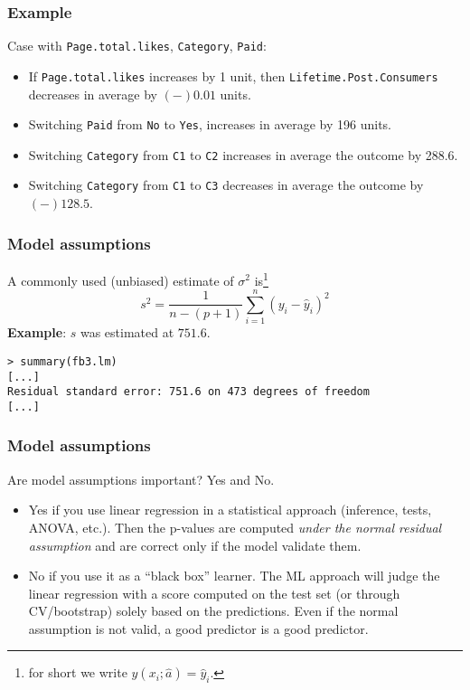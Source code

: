 \begin{frame}
\frametitle{Example}
Case with {\tt Page.total.likes}, {\tt Category}, {\tt Paid}:
\begin{itemize}
\item If {\tt Page.total.likes} increases by 1 unit, then {\tt Lifetime.Post.Consumers} decreases in average by $(-)0.01$ units.
\item Switching {\tt Paid} from {\tt No} to {\tt Yes}, increases in average by 196 units.
\item Switching {\tt Category} from {\tt C1} to {\tt C2} increases in average the outcome by 288.6. 
\item Switching {\tt Category} from {\tt C1} to {\tt C3} decreases in average the outcome by $(-)128.5$. 
\end{itemize}
\end{frame}
\begin{frame}[fragile]
\frametitle{Model assumptions}
A commonly used (unbiased) estimate of $\sigma^2$ is\footnote{for short we write $y(x_i;\hat{a})=\hat{y}_i$.} 
$$
s^2 = \frac{1}{n-(p+1)} \sum_{i=1}^n (y_i-\hat{y}_i)^2
$$
{\bf Example}: $s$ was estimated at $751.6$.\\
\scriptsize
\begin{verbatim}
> summary(fb3.lm)
[...]
Residual standard error: 751.6 on 473 degrees of freedom
[...]
\end{verbatim}
\end{frame}
\begin{frame}
\frametitle{Model assumptions}
Are model assumptions important? Yes and No.
\begin{itemize}
\item Yes if you use linear regression in a statistical approach (inference, tests, ANOVA, etc.). Then the p-values are computed {\it under the normal residual assumption} and are correct only if the model validate them.
\item No if you use it as a ``black box'' learner. The ML approach will judge the linear regression with a score computed on the test set (or through CV/bootstrap) solely based on the predictions. Even if the normal assumption is not valid, a good predictor is a good predictor.
\end{itemize}
\end{frame}
